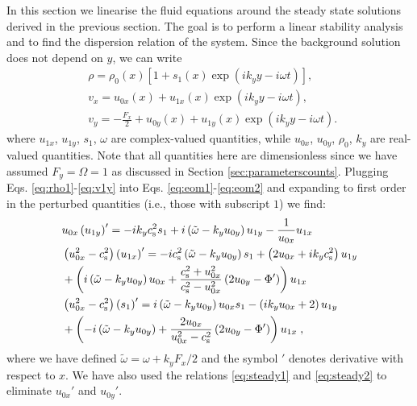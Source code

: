 \documentclass[useAMS,usenatbib]{mn2e}
\begin{document}
In this section we linearise the fluid equations around the steady state solutions derived in the previous section. The goal is to perform a linear stability analysis and to find the dispersion relation of the system. Since the background solution does not depend on $y$, we can write
%
\begin{align} 
& \rho = \rho_0\left(x\right)\left[1+ s_1\left(x\right) \exp\left(i k_y y - i \omega t \right)\right] \label{eq:rho1}, \\
& v_x = u_{0x}\left(x\right) + u_{1x}\left(x\right)\exp\left(i k_y y - i \omega t \right)  \label{eq:v1x}, \\
& v_y = -\frac{F_x}{2}+u_{0y}\left(x\right) + u_{1y}\left(x\right)\exp\left(i k_y y - i \omega t \right)  \label{eq:v1y}.\;
\end{align}
where $u_{1x}$, $u_{1y}$, $s_1$, $\omega$ are complex-valued quantities, while $u_{0x}$, $u_{0y}$, $\rho_0$, $k_y$ are real-valued quantities. Note that all quantities here are dimensionless since we have assumed $F_y=\Omega=1$ as discussed in Section \ref{sec:parameterscounts}. Plugging Eqs. \eqref{eq:rho1}-\eqref{eq:v1y} into Eqs. \eqref{eq:eom1}-\eqref{eq:eom2} and expanding to first order in the perturbed quantities (i.e., those with subscript $1$) we find:
\begin{align}
& u_{0x}\left(u_{1y}\right)'=-i k_y c_{\rm s}^2 s_1+i \left( \tilde{\omega} - k_y u_{0y} \right) u_{1y}-\frac{1}{u_{0x}}u_{1x} \label{eq:main_ux}\\
& \left(u_{0x}^2-c_{\rm s}^2\right)\left(u_{1x}\right)' = -i c_{\rm s}^2\left( \tilde{\omega} - k_y u_{0y} \right)s_1+\left(2 u_{0x}+ik_y c_{\rm s}^2\right)u_{1y} \nonumber \\
&+\left(i\left( \tilde{\omega} - k_y u_{0y} \right) u_{0x}  + \frac{ c_{\rm s}^2 + u_{0x}^2}{c_{\rm s}^2 - u_{0x}^2} \left(2 u_{0y} - \Phi' \right)          \right)u_{1x} \label{eq:main_uy}\\
& \left(u_{0x}^2-c_{\rm s}^2\right)\left(s_1\right)'=i\left( \tilde{\omega} - k_y u_{0y} \right)u_{0x}s_1-\left(ik_y u_{0x}+2\right)u_{1y} \nonumber \\
&+\left( -i\left( \tilde{\omega} - k_y u_{0y} \right)  + \frac{2 u_{0x}}{u_{0x}^2-c_{\rm s}^2} \left(2 u_{0y} - \Phi' \right)   \right)u_{1x} \label{eq:main_rho}\;,
\end{align}
where we have defined $\tilde{\omega}=\omega+k_y F_x/2$ and the symbol $'$ denotes derivative with respect to $x$. We have also used the relations \eqref{eq:steady1} and \eqref{eq:steady2} to eliminate $u_{0x}'$ and $u_{0y}'$.
\end{document}
